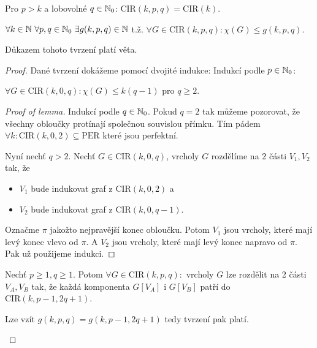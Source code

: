 \begin{observ}
	Pro $p > k$ a lobovolné $q \in \mathbb{N}_0$: $\text{CIR}(k,p,q) = \text{CIR}(k)$.
\end{observ}

\begin{claim}
	$\forall k \in \N \ \forall p, q \in \N_0 \ \exists g(k,p,q) \in \N$ t.ž. $\forall G \in \text{CIR}(k,p,q) : \chi(G) \leq g(k,p,q)$.
\end{claim}

\begin{observ}
	Důkazem tohoto tvrzení platí věta.
\end{observ}

\begin{proof}
	Dané tvrzení dokážeme pomocí dvojité indukce: Indukcí podle $p \in \mathbb{N}_0$:
	
	\begin{lemma}
		$\forall G \in \text{CIR}(k,0,q) : \chi (G) \leq k (q-1)$ pro $q \geq 2$.
	\end{lemma}
	
	\begin{proof}[Proof of lemma]
		Indukcí podle $q \in \mathbb{N}_0$. Pokud $q = 2$ tak můžeme pozorovat, že všechny obloučky protínají společnou souvislou přímku. Tím pádem $\forall k : \text{CIR}(k,0,2) \subseteq \text{PER}$ které jsou perfektní.
		
		Nyní nechť $q > 2$. Nechť $G \in \text{CIR}(k, 0, q)$, vrcholy $G$ rozdělíme na 2 části $V_1, V_2$ tak, že
		
		\begin{itemize}
			\item $V_1$ bude indukovat graf z $\text{CIR}(k,0,2)$ a
			\item $V_2$ bude indukovat graf z $\text{CIR}(k,0,q-1)$.
		\end{itemize}
		
		Označme $\pi$ jakožto nejpravější konec obloučku. Potom $V_1$ jsou vrcholy, které mají levý konec vlevo od $\pi$. A $V_2$ jsou vrcholy, které mají levý konec napravo od $\pi$. Pak už použijeme indukci.
	\end{proof}
	
	\begin{lemma}
		Nechť $p \geq 1, q \geq 1$. Potom $\forall G \in \text{CIR}(k,p,q):$ vrcholy $G$ lze rozdělit na 2 části $V_A, V_B$ tak, že každá komponenta $G[V_A]$ i $G[V_B]$ patří do $\text{CIR}(k, p-1, 2q+1)$.
	\end{lemma}
	
	\begin{cor}
		Lze vzít $g(k,p,q) = g (k, p-1, 2q+1)$ tedy tvrzení pak platí.
	\end{cor}
	

\end{proof}
